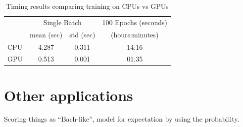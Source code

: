 


\begin{table}[tb]
  \centering
  \caption{Timing results comparing training on CPUs vs GPUs}
  \label{tab:label}
  \begin{tabular}{l c c c}
    \toprule
    \multirow{2}{*}{} & \multicolumn{2}{c}{Single Batch} & 100 Epochs (seconds) \\
    \cmidrule{2-4}
    & mean (sec) & std (sec) & (hours:minutes)\\
    \midrule
    CPU & 4.287 & 0.311 & 14:16 \\
    GPU & 0.513 & 0.001 & 01:35\\
    \bottomrule
  \end{tabular}
\end{table}

\section{Other applications}

Scoring things as ``Bach-like'', model for expectation by using the probability.
